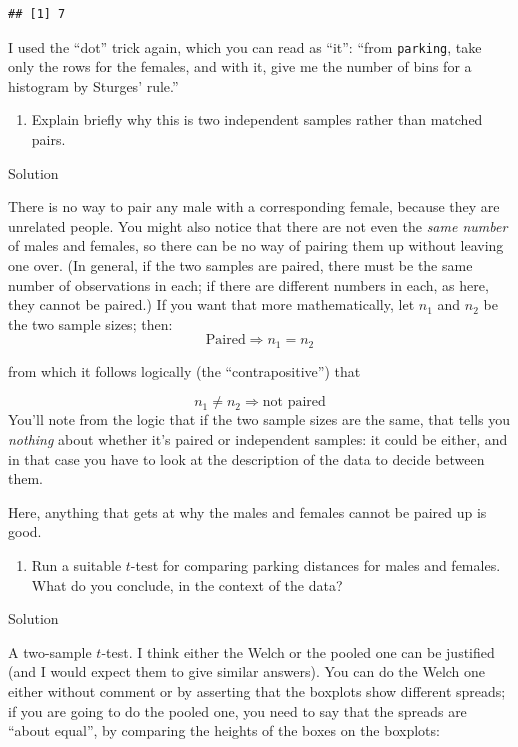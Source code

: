 \documentclass[]{tufte-book}
\providecommand{\tightlist}{%
  \setlength{\itemsep}{0pt}\setlength{\parskip}{0pt}}
\theoremstyle{definition}
\theoremstyle{definition}
\theoremstyle{definition}
\theoremstyle{remark}
\begin{document}
\begin{verbatim}
## [1] 7
\end{verbatim}

I used the ``dot'' trick again, which you can read as ``it'': ``from
\texttt{parking}, take only the rows for the females, and with it, give
me the number of bins for a histogram by Sturges' rule.''

\begin{enumerate}
\def\labelenumi{(\alph{enumi})}
\setcounter{enumi}{3}
\tightlist
\item
  Explain briefly why this is two independent samples rather than
  matched pairs.
\end{enumerate}

Solution

There is no way to pair any male with a corresponding female, because
they are unrelated people. You might also notice that there are not even
the \emph{same number} of males and females, so there can be no way of
pairing them up without leaving one over. (In general, if the two
samples are paired, there must be the same number of observations in
each; if there are different numbers in each, as here, they cannot be
paired.) If you want that more mathematically, let \(n_1\) and \(n_2\)
be the two sample sizes; then: \[
\mbox{Paired} \Longrightarrow n_1=n_2
\]

from which it follows logically (the ``contrapositive'') that

\[
n_1 \ne n_2 \Longrightarrow \mbox{not paired}
\] You'll note from the logic that if the two sample sizes are the same,
that tells you \emph{nothing} about whether it's paired or independent
samples: it could be either, and in that case you have to look at the
description of the data to decide between them.

Here, anything that gets at why the males and females cannot be paired
up is good.

\begin{enumerate}
\def\labelenumi{(\alph{enumi})}
\setcounter{enumi}{4}
\tightlist
\item
  Run a suitable \(t\)-test for comparing parking distances for males
  and females. What do you conclude, in the context of the data?
\end{enumerate}

Solution

A two-sample \(t\)-test. I think either the Welch or the pooled one can
be justified (and I would expect them to give similar answers). You can
do the Welch one either without comment or by asserting that the
boxplots show different spreads; if you are going to do the pooled one,
you need to say that the spreads are ``about equal'', by comparing the
heights of the boxes on the boxplots:
\end{document}
